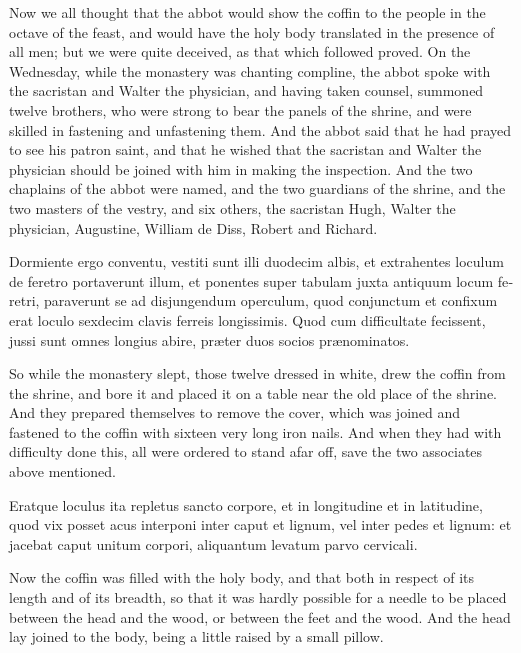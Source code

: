 \documentclass[10pt]{book}
\begin{document}
\begin{paracol}{2}
Now we all thought that the abbot would show the coffin to the people in the octave of the feast, and would have the holy body translated in the presence of all men; but we were quite deceived, as that which followed proved. On the Wednesday, while the monastery was chanting compline, the abbot spoke with the sacristan and Walter the physician, and having taken counsel, summoned twelve brothers, who were strong to bear the panels of the shrine, and were skilled in fastening and unfastening them. And the abbot said that he had prayed to see his patron saint, and that he wished that the sacristan and Walter the physician should be joined with him in making the inspection. And the two chaplains of the abbot were named, and the two guardians of the shrine, and the two masters of the vestry, and six others, the sacristan Hugh, Walter the physician, Augustine, William de Diss, Robert and Richard.

\switchcolumn*

\begin{otherlanguage}{latin}
Dormiente ergo conventu, vestiti sunt illi duodecim albis, et extrahentes loculum de feretro portaverunt illum, et ponentes super tabulam juxta antiquum locum feretri, paraverunt se ad disjungendum operculum, quod conjunctum et confixum erat loculo sexdecim clavis ferreis longissimis. Quod cum difficultate fecissent, jussi sunt omnes longius abire, pr\ae{}ter duos socios pr\ae{}nominatos.
\end{otherlanguage}

\switchcolumn

So while the monastery slept, those twelve dressed in white, drew the coffin from the shrine, and bore it and placed it on a table near the old place of the shrine. And they prepared themselves to remove the cover, which was joined and fastened to the coffin with sixteen very long iron nails. And when they had with difficulty done this, all were ordered to stand afar off, save the two associates above mentioned.

\switchcolumn*

\begin{otherlanguage}{latin}
Eratque loculus ita repletus sancto corpore, et in longitudine et in latitudine, quod vix posset acus interponi inter caput et lignum, vel inter pedes et lignum: et jacebat caput unitum corpori, aliquantum levatum parvo cervicali.
\end{otherlanguage}

\switchcolumn

Now the coffin was filled with the holy body, and that both in respect of its length and of its breadth, so that it was hardly possible for a needle to be placed between the head and the wood, or between the feet and the wood. And the head lay joined to the body, being a little raised by a small pillow.


\end{paracol}
\end{document}
